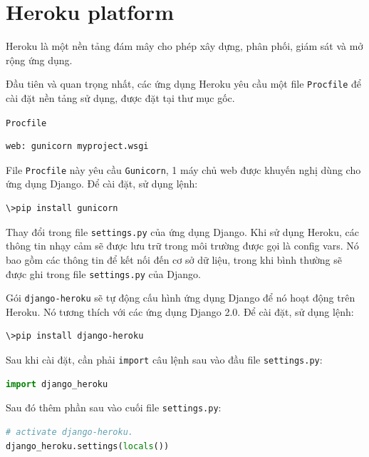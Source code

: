 \section{Heroku platform}
Heroku là một nền tảng đám mây cho phép xây dựng, phân phối, giám sát và mở rộng ứng dụng\cite{heroku}.
\par
Đầu tiên và quan trọng nhất, các ứng dụng Heroku yêu cầu một file \texttt{Procfile} để cài đặt nền tảng sử dụng, được đặt tại thư mục gốc.
\par
\texttt{Procfile}
\begin{lstlisting}[language=sh]
web: gunicorn myproject.wsgi
\end{lstlisting}
\par
File \texttt{Procfile} này yêu cầu \texttt{Gunicorn}, 1 máy chủ web được khuyến nghị dùng cho ứng dụng Django. Để cài đặt, sử dụng lệnh:
\begin{lstlisting}[language=bash]
\>pip install gunicorn
\end{lstlisting}
\par
Thay đổi trong file \texttt{settings.py} của ứng dụng Django. Khi sử dụng Heroku, các thông tin nhạy cảm sẽ được lưu trữ trong môi trường được gọi là config vars. Nó bao gồm các thông tin để kết nối đến cơ sở dữ liệu, trong khi bình thường sẽ được ghi trong file \texttt{settings.py} của Django.
\par
Gói \texttt{django-heroku} sẽ tự động cấu hình ứng dụng Django để nó hoạt động trên Heroku. Nó tương thích với các ứng dụng Django 2.0. Để cài đặt, sử dụng lệnh:
\begin{lstlisting}[language=bash]
\>pip install django-heroku
\end{lstlisting}
\par
Sau khi cài đặt, cần phải \texttt{import} câu lệnh sau vào đầu file \texttt{settings.py}:
\begin{lstlisting}[language=Python]
import django_heroku
\end{lstlisting}
\par
Sau đó thêm phần sau vào cuối file \texttt{settings.py}:
\begin{lstlisting}[language=Python]
# activate django-heroku.
django_heroku.settings(locals())
\end{lstlisting}